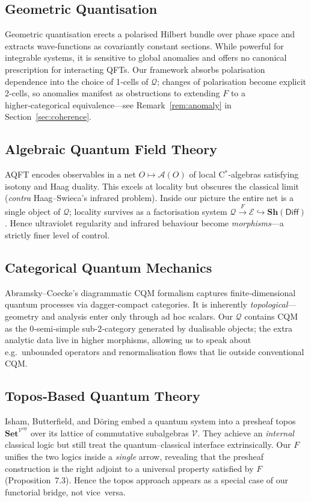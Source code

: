 \subsection{Geometric Quantisation}
Geometric quantisation \cite{Kostant1970,Souriau1970} erects a polarised
Hilbert bundle over phase space and extracts wave‑functions as covariantly
constant sections.  
While powerful for integrable systems, it is sensitive to global anomalies
and offers no canonical prescription for interacting QFTs.  
Our framework absorbs polarisation dependence into the choice of 1‑cells of
$\mathcal Q$; changes of polarisation become explicit 2‑cells, so anomalies
manifest as obstructions to extending $F$ to a higher‑categorical
equivalence—see Remark \ref{rem:anomaly} in Section~\ref{sec:coherence}.

\subsection{Algebraic Quantum Field Theory}
AQFT encodes observables in a net
$O\mapsto\mathcal A(O)$ of local C$^{*}$‑algebras satisfying isotony and
Haag duality.
This excels at locality but obscures the classical limit
(\emph{contra} Haag–Swieca’s infrared problem).
Inside our picture the entire net is a single object of
$\mathcal Q$; locality survives as a factorisation system
\( \mathcal Q \xrightarrow{F} \mathcal E \hookrightarrow \mathbf{Sh}(\mathsf{Diff})\).
Hence ultraviolet regularity and infrared behaviour become
\emph{morphisms}—a strictly finer level of control.

\subsection{Categorical Quantum Mechanics}
Abramsky–Coecke’s diagrammatic CQM formalism
captures finite‑dimensional quantum processes via
dagger‑compact categories.
It is inherently \emph{topological}—
geometry and analysis enter only through ad hoc
scalars.
Our $\mathcal Q$ contains CQM as the 0‑semi‑simple sub‑2‑category generated
by dualisable objects; the extra analytic data live in higher morphisms,
allowing us to speak about e.g.\ unbounded operators and renormalisation
flows that lie outside conventional CQM.

\subsection{Topos‑Based Quantum Theory}
Isham, Butterfield, and Döring embed a quantum system into a
presheaf topos $\mathbf{Set}^{\mathcal V^{\operatorname{op}}}$
over its lattice of commutative subalgebras $\mathcal V$.
They achieve an \emph{internal} classical logic but still treat the
quantum–classical interface extrinsically.  
Our $F$ unifies the two logics inside a \emph{single}
arrow, revealing that the presheaf construction is the
right adjoint to a universal property satisfied by $F$
(Proposition 7.3).
Hence the topos approach appears as a special case of our functorial
bridge, not vice versa.

